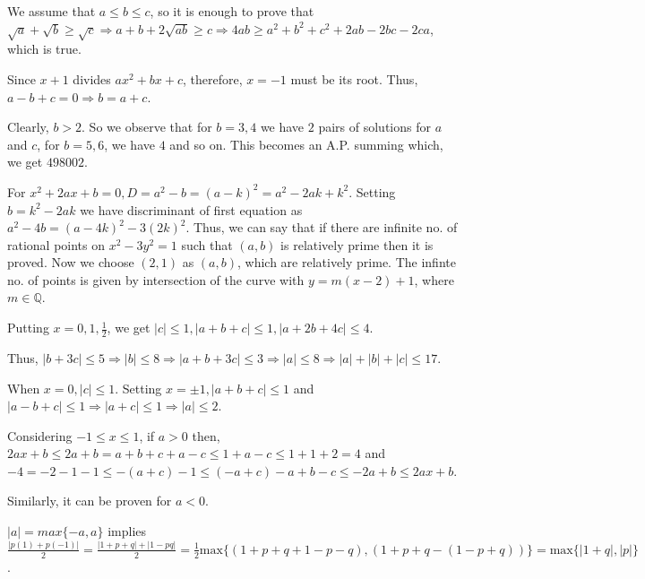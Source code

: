   We assume that $a\leq b\leq c$, so it is enough to prove that $\sqrt{a} + \sqrt{b} \geq
  \sqrt{c}\Rightarrow a + b + 2\sqrt{ab}\geq c \Rightarrow 4ab\geq a^2 + b^2 + c^2 + 2ab - 2bc - 2ca$, which
  is true.
\item Since $x + 1$ divides $ax^2 + bx + c$, therefore, $x = -1$ must be its root. Thus, $a - b + c = 0
  \Rightarrow b = a + c$.

  Clearly, $b > 2$. So we observe that for $b = 3, 4$ we have $2$ pairs of solutions for $a$ and $c$, for $b
  = 5, 6$, we have $4$ and so on. This becomes an A.P. summing which, we get $498002$.
\item For $x^2 + 2ax + b = 0, D = a^2 - b = (a - k)^2 = a^2 - 2ak + k^2$. Setting $b = k^2 - 2ak$ we have
  discriminant of first equation as $a^2 - 4b = (a - 4k)^2 - 3(2k)^2$. Thus, we can say that if there are
  infinite no. of rational points on $x^2 - 3y^2 = 1$ such that $(a, b)$ is relatively prime then it is
  proved. Now we choose $(2, 1)$ as $(a, b)$, which are relatively prime. The infinte no. of points is given
  by intersection of the curve with $y = m(x - 2) + 1$, where $m\in\mathbb{Q}$.
\item Putting $x = 0, 1, \frac{1}{2}$, we get $|c|\leq 1, |a + b + c|\leq 1, |a + 2b + 4c|\leq 4$.

  Thus, $|b + 3c|\leq 5 \Rightarrow |b|\leq 8 \Rightarrow |a + b + 3c|\leq 3\Rightarrow |a|\leq 8
  \Rightarrow |a| + |b| + |c|\leq 17$.
\item When $x = 0, |c|\leq 1$. Setting $x = \pm 1, |a + b + c|\leq 1$ and $|a - b + c|\leq 1\Rightarrow |a +
  c|\leq 1\Rightarrow |a|\leq 2$.

  Considering $-1\leq x\leq 1$, if $a > 0$ then, $2ax + b \leq 2a + b = a + b + c + a - c\leq 1 + a - c\leq
  1 + 1 + 2 = 4$ and $-4 = -2 - 1 - 1\leq -(a + c) - 1\leq (-a + c) - a + b - c\leq -2a + b\leq 2ax + b$.

  Similarly, it can be proven for $a < 0$.
\item $|a| = max\{-a, a\}$ implies $\frac{|p(1) + p(-1)|}{2} = \frac{|1 + p + q| + |1 - p  q|}{2} =
  \frac{1}{2}\mathrm{max}\{(1 + p + q + 1 - p - q), (1 + p + q - (1 - p + q))\} = \mathrm{max}\{|1 + q|, |p|\}$.

